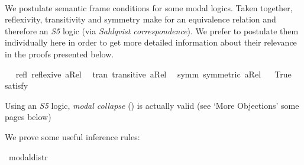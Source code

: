 \begin{isabellebody}
%
\isadelimproof
\ %
\endisadelimproof
%
\isatagproof
{}\isamarkupfalse%
%
\endisatagproof
{\isafoldproof}%
%
\isadelimproof
%
\endisadelimproof
%
\begin{isamarkuptext}%
We postulate semantic frame conditions for some modal logics. Taken together, reflexivity, transitivity and symmetry
 make for an equivalence relation and therefore an \emph{S5} logic (via \emph{Sahlqvist correspondence}).
 We prefer to postulate them individually here in order to get more detailed information about their relevance 
 in the proofs presented below.%
\end{isamarkuptext}\isamarkuptrue%
\isamarkupfalse%
\ \isanewline
\ refl{\isacharcolon}\ {\isachardoublequoteopen}reflexive\ aRel{\isachardoublequoteclose}\ \isanewline
\ tran{\isacharcolon}\ {\isachardoublequoteopen}transitive\ aRel{\isachardoublequoteclose}\ \isanewline
\ symm{\isacharcolon}\ {\isachardoublequoteopen}symmetric\ aRel{\isachardoublequoteclose}\isanewline
\ \isanewline
{}\isamarkupfalse%
\ True\ \isamarkupfalse%
{\isacharbrackleft}satisfy{\isacharbrackright}%
\isadelimproof
\ %
\endisadelimproof
%
\isatagproof
{}\isamarkupfalse%
\ %
%
\endisatagproof
{\isafoldproof}%
%
\isadelimproof
%
\endisadelimproof
%
\begin{isamarkuptext}%
Using an \emph{S5} logic, \emph{modal collapse} (\isa{{\isasymlfloor}\isactrlbold {\isasymforall}{\isasymPhi}{\isachardot}{\isacharparenleft}{\isasymPhi}\ \isactrlbold {\isasymrightarrow}\ {\isacharparenleft}\isactrlbold {\isasymbox}\ {\isasymPhi}{\isacharparenright}{\isacharparenright}{\isasymrfloor}}) is actually valid (see `More Objections' some pages below)%
\end{isamarkuptext}\isamarkuptrue%
%
\begin{isamarkuptext}%
We prove some useful inference rules:%
\end{isamarkuptext}\isamarkuptrue%
\isamarkupfalse%
\ modal{\isacharunderscore}distr{\isacharcolon}\ {\isachardoublequoteopen}{\isasymlfloor}\isactrlbold {\isasymbox}{\isacharparenleft}{\isasymphi}\ \isactrlbold {\isasymrightarrow}\ {\isasympsi}{\isacharparenright}{\isasymrfloor}\ {\isasymLongrightarrow}\ {\isasymlfloor}{\isacharparenleft}\isactrlbold {\isasymdiamond}{\isasymphi}\ \isactrlbold {\isasymrightarrow}\ \isactrlbold {\isasymdiamond}{\isasympsi}{\isacharparenright}{\isasymrfloor}{\isachardoublequoteclose}%

\end{isabellebody}
